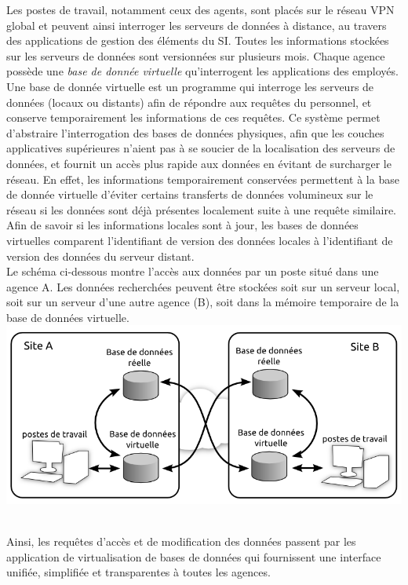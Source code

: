 \documentclass[a4paper]{article}
\begin{document}
Les postes de travail, notamment ceux des agents, sont placés sur le réseau VPN global et peuvent ainsi interroger les serveurs de données à distance, au travers des applications de gestion des éléments du SI. Toutes les informations stockées sur les serveurs de données sont versionnées sur plusieurs mois. Chaque agence possède une \textit{base de donnée virtuelle} qu'interrogent les applications des employés.\\
Une base de donnée virtuelle est un programme qui interroge les serveurs de données (locaux ou distants) afin de répondre aux requêtes du personnel, et conserve temporairement les informations de ces requêtes. Ce système permet d'abstraire l'interrogation des bases de données physiques, afin que les couches applicatives supérieures n'aient pas à se soucier de la localisation des serveurs de données, et fournit un accès plus rapide aux données en évitant de surcharger le réseau. En effet, les informations temporairement conservées permettent à la base de donnée virtuelle d'éviter certains transferts de données volumineux sur le réseau si les données sont déjà présentes localement suite à une requête similaire. Afin de savoir si les informations locales sont à jour, les bases de données virtuelles comparent l'identifiant de version des données locales à l'identifiant de version des données du serveur distant.\\
Le schéma ci-dessous montre l'accès aux données par un poste situé dans une agence A. Les données recherchées peuvent être stockées soit sur un serveur local, soit sur un serveur d'une autre agence (B), soit dans la mémoire temporaire de la base de données virtuelle. \\
\includegraphics[width=\linewidth]{Includes/archi_bddVirtuelle.png}

~\\
Ainsi, les requêtes d'accès et de modification des données passent par les application de virtualisation de bases de données qui fournissent une interface unifiée, simplifiée et transparentes à toutes les agences.
\end{document}
